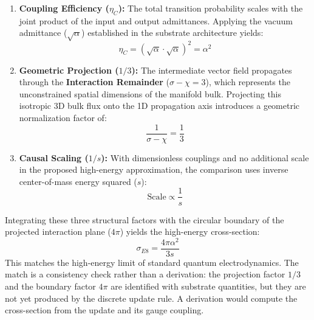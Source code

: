 \begin{enumerate}
    \item \textbf{Coupling Efficiency ($\eta_C$):} The total transition probability scales with the joint product of the input and output admittances. Applying the vacuum admittance ($\sqrt{\alpha}$) established in the substrate architecture yields: 
    \begin{equation}
        \eta_C = (\sqrt{\alpha} \cdot \sqrt{\alpha})^2 = \alpha^2
    \end{equation}
    
    \item \textbf{Geometric Projection ($1/3$):} The intermediate vector field propagates through the \textbf{Interaction Remainder} ($\sigma - \chi = 3$), which represents the unconstrained spatial dimensions of the manifold bulk. Projecting this isotropic 3D bulk flux onto the 1D propagation axis introduces a geometric normalization factor of:
    \begin{equation}
        \frac{1}{\sigma - \chi} = \frac{1}{3}
    \end{equation}
    
    \item \textbf{Causal Scaling ($1/s$):} With dimensionless couplings and no additional scale in the proposed high-energy approximation, the comparison uses inverse center-of-mass energy squared ($s$):
    \begin{equation}
        \text{Scale} \propto \frac{1}{s}
    \end{equation}
\end{enumerate}

Integrating these three structural factors with the circular boundary of the projected interaction plane ($4\pi$) yields the high-energy cross-section:
\begin{equation}
\sigma_{E8} = \frac{4\pi \alpha^2}{3s}
\end{equation}
This matches the high-energy limit of standard quantum electrodynamics. The match is a consistency check rather than a derivation: the projection factor $1/3$ and the boundary factor $4\pi$ are identified with substrate quantities, but they are not yet produced by the discrete update rule. A derivation would compute the cross-section from the update and its gauge coupling.

